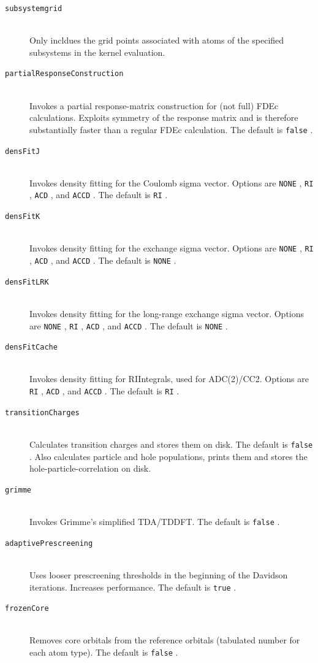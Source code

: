 \documentclass[bibliography=totocnumbered,a4paper,10pt,oneside]{scrbook}
\newcommand{\ttt}[1]{%
  \begingroup\setlength{\fboxsep}{1pt}%
  \colorbox{serenity-green!30}{\texttt{\hspace*{2pt}\vphantom{(g}#1\hspace*{2pt}}}%
  \endgroup
}
\begin{document}
\begin{description}
    \item[\texttt{subsystemgrid}]\hfill\\
    Only incldues the grid points associated with atoms of the specified subsystems in the kernel evaluation.
    \item[\texttt{partialResponseConstruction}]\hfill\\
    Invokes a partial response-matrix construction for (not full) FDEc calculations.
    Exploits symmetry of the response matrix and is therefore substantially faster than
    a regular FDEc calculation.
    The default is \ttt{false}.
    \item[\texttt{densFitJ}]\hfill\\
    Invokes density fitting for the Coulomb sigma vector. 
    Options are \ttt{NONE}, \ttt{RI}, \ttt{ACD}, and \ttt{ACCD}. The default is \ttt{RI}.
    \item[\texttt{densFitK}]\hfill\\
    Invokes density fitting for the exchange sigma vector. 
    Options are \ttt{NONE}, \ttt{RI}, \ttt{ACD}, and \ttt{ACCD}. The default is \ttt{NONE}.
    \item[\texttt{densFitLRK}]\hfill\\
    Invokes density fitting for the long-range exchange sigma vector. 
    Options are \ttt{NONE}, \ttt{RI}, \ttt{ACD}, and \ttt{ACCD}. The default is \ttt{NONE}.
    \item[\texttt{densFitCache}]\hfill\\
    Invokes density fitting for RIIntegrals, used for ADC(2)/CC2. 
    Options are \ttt{RI}, \ttt{ACD}, and \ttt{ACCD}. The default is \ttt{RI}.
    \item[\texttt{transitionCharges}]\hfill\\
    Calculates transition charges and stores them on disk. The default is \ttt{false}. Also calculates particle and hole populations, prints them and stores the hole-particle-correlation on disk.
    \item[\texttt{grimme}]\hfill\\
    Invokes Grimme's simplified TDA/TDDFT. The default is \ttt{false}.
    \item[\texttt{adaptivePrescreening}]\hfill\\
    Uses looser prescreening thresholds in the beginning of the Davidson iterations. Increases performance. The default is \ttt{true}.
    \item[\texttt{frozenCore}]\hfill\\
    Removes core orbitals from the reference orbitals (tabulated number for each atom type). The default is \ttt{false}.

\end{description}
\end{document}
